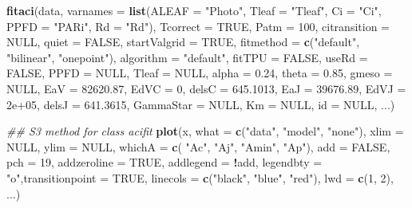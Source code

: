 \documentclass[
]{krantz}
\makeatletter
\newenvironment{Shaded}{\begin{snugshade}}{\end{snugshade}}
\newcommand{\CommentTok}[1]{\textcolor[rgb]{0.56,0.35,0.01}{\textit{#1}}}
\newcommand{\DataTypeTok}[1]{\textcolor[rgb]{0.13,0.29,0.53}{#1}}
\newcommand{\DecValTok}[1]{\textcolor[rgb]{0.00,0.00,0.81}{#1}}
\newcommand{\FloatTok}[1]{\textcolor[rgb]{0.00,0.00,0.81}{#1}}
\newcommand{\KeywordTok}[1]{\textcolor[rgb]{0.13,0.29,0.53}{\textbf{#1}}}
\newcommand{\NormalTok}[1]{#1}
\newcommand{\OperatorTok}[1]{\textcolor[rgb]{0.81,0.36,0.00}{\textbf{#1}}}
\newcommand{\OtherTok}[1]{\textcolor[rgb]{0.56,0.35,0.01}{#1}}
\newcommand{\StringTok}[1]{\textcolor[rgb]{0.31,0.60,0.02}{#1}}
\newenvironment{kframe}{%
\medskip{}
\setlength{\fboxsep}{.8em}
 \def\at@end@of@kframe{}%
 \ifinner\ifhmode%
  \def\at@end@of@kframe{\end{minipage}}%
  \begin{minipage}{\columnwidth}%
 \fi\fi%
 \def\FrameCommand##1{\hskip\@totalleftmargin \hskip-\fboxsep
 \colorbox{shadecolor}{##1}\hskip-\fboxsep
     \hskip-\linewidth \hskip-\@totalleftmargin \hskip\columnwidth}%
 \MakeFramed {\advance\hsize-\width
   \@totalleftmargin\z@ \linewidth\hsize
   \@setminipage}}%
 {\par\unskip\endMakeFramed%
 \at@end@of@kframe}
\renewenvironment{Shaded}{\begin{kframe}}{\end{kframe}}
\makeatother
\begin{document}
\begin{Shaded}
\begin{Highlighting}[]
\KeywordTok{fitaci}\NormalTok{(data, }\DataTypeTok{varnames =} \KeywordTok{list}\NormalTok{(}\DataTypeTok{ALEAF =} \StringTok{"Photo"}\NormalTok{, }
  \DataTypeTok{Tleaf =} \StringTok{"Tleaf"}\NormalTok{, }\DataTypeTok{Ci =} \StringTok{"Ci"}\NormalTok{, }\DataTypeTok{PPFD =} \StringTok{"PARi"}\NormalTok{, }
  \DataTypeTok{Rd =} \StringTok{"Rd"}\NormalTok{), }\DataTypeTok{Tcorrect =} \OtherTok{TRUE}\NormalTok{, }\DataTypeTok{Patm =} \DecValTok{100}\NormalTok{, }
  \DataTypeTok{citransition =} \OtherTok{NULL}\NormalTok{, }\DataTypeTok{quiet =} \OtherTok{FALSE}\NormalTok{, }
  \DataTypeTok{startValgrid =} \OtherTok{TRUE}\NormalTok{, }\DataTypeTok{fitmethod =} 
  \KeywordTok{c}\NormalTok{(}\StringTok{"default"}\NormalTok{, }\StringTok{"bilinear"}\NormalTok{, }\StringTok{"onepoint"}\NormalTok{), }
  \DataTypeTok{algorithm =} \StringTok{"default"}\NormalTok{, }\DataTypeTok{fitTPU =} \OtherTok{FALSE}\NormalTok{, }
  \DataTypeTok{useRd =} \OtherTok{FALSE}\NormalTok{, }\DataTypeTok{PPFD =} \OtherTok{NULL}\NormalTok{, }\DataTypeTok{Tleaf =} \OtherTok{NULL}\NormalTok{, }
  \DataTypeTok{alpha =} \FloatTok{0.24}\NormalTok{, }\DataTypeTok{theta =} \FloatTok{0.85}\NormalTok{, }\DataTypeTok{gmeso =} \OtherTok{NULL}\NormalTok{, }
  \DataTypeTok{EaV =} \FloatTok{82620.87}\NormalTok{, }\DataTypeTok{EdVC =} \DecValTok{0}\NormalTok{, }\DataTypeTok{delsC =} \FloatTok{645.1013}\NormalTok{,}
  \DataTypeTok{EaJ =} \FloatTok{39676.89}\NormalTok{, }\DataTypeTok{EdVJ =} \FloatTok{2e+05}\NormalTok{, }
  \DataTypeTok{delsJ =} \FloatTok{641.3615}\NormalTok{, }\DataTypeTok{GammaStar =} \OtherTok{NULL}\NormalTok{, }
  \DataTypeTok{Km =} \OtherTok{NULL}\NormalTok{, }\DataTypeTok{id =} \OtherTok{NULL}\NormalTok{, ...)}

\CommentTok{\#\# S3 method for class \textquotesingle{}acifit\textquotesingle{}}
\KeywordTok{plot}\NormalTok{(x, }\DataTypeTok{what =} \KeywordTok{c}\NormalTok{(}\StringTok{"data"}\NormalTok{, }\StringTok{"model"}\NormalTok{, }\StringTok{"none"}\NormalTok{),}
     \DataTypeTok{xlim =} \OtherTok{NULL}\NormalTok{, }\DataTypeTok{ylim =} \OtherTok{NULL}\NormalTok{, }\DataTypeTok{whichA =} \KeywordTok{c}\NormalTok{(}
       \StringTok{"Ac"}\NormalTok{, }\StringTok{"Aj"}\NormalTok{, }\StringTok{"Amin"}\NormalTok{, }\StringTok{"Ap"}\NormalTok{), }\DataTypeTok{add =} \OtherTok{FALSE}\NormalTok{,}
\DataTypeTok{pch =} \DecValTok{19}\NormalTok{, }\DataTypeTok{addzeroline =} \OtherTok{TRUE}\NormalTok{, }\DataTypeTok{addlegend =} 
  \OperatorTok{!}\NormalTok{add, }\DataTypeTok{legendbty =} \StringTok{"o"}\NormalTok{,}\DataTypeTok{transitionpoint =} \OtherTok{TRUE}\NormalTok{, }
\DataTypeTok{linecols =} \KeywordTok{c}\NormalTok{(}\StringTok{"black"}\NormalTok{, }\StringTok{"blue"}\NormalTok{, }\StringTok{"red"}\NormalTok{), }\DataTypeTok{lwd =} \KeywordTok{c}\NormalTok{(}\DecValTok{1}\NormalTok{,}
\DecValTok{2}\NormalTok{), ...)}
\end{Highlighting}
\end{Shaded}
\end{document}
